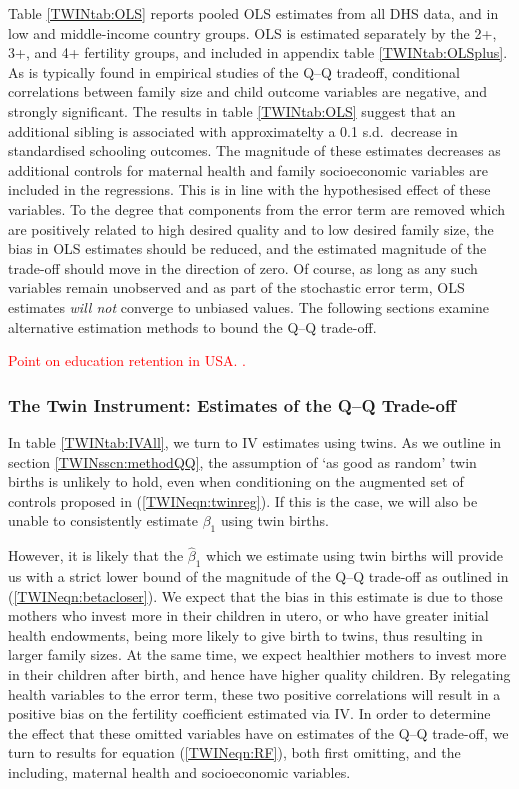 \documentclass[subeqn]{article}
\begin{document}
\begin{spacing}{1.4}
Table \ref{TWINtab:OLS} reports pooled OLS estimates from all DHS data, and in 
low and middle-income country groups. OLS is estimated separately by the 2+, 3+,
and 4+ fertility groups, and included in appendix table \ref{TWINtab:OLSplus}.
As is typically found in empirical studies of the Q--Q tradeoff, conditional 
correlations between family size and child outcome variables are negative, and 
strongly significant.  The results in table \ref{TWINtab:OLS} suggest that an 
additional sibling is associated with approximatelty a 0.1 s.d.\ decrease in 
standardised schooling outcomes.  The magnitude of these estimates decreases
as additional controls for maternal health and family socioeconomic variables
are included in the regressions. This is in line with the hypothesised effect
of these variables.  To the degree that components from the error term are 
removed which are positively related to high desired quality and to low desired 
family size, the bias in OLS estimates should be reduced, and the estimated 
magnitude of the trade-off should move in the direction of zero. Of course, as 
long as any such variables remain unobserved and as part of the stochastic error 
term, OLS estimates \emph{will not} converge to unbiased values.  The following 
sections examine alternative estimation methods to bound the Q--Q trade-off.

\textcolor{red}{Point on education retention in USA. \citet{Warrenetal2014}.}

\subsubsection{The Twin Instrument: Estimates of the Q--Q Trade-off}
In table \ref{TWINtab:IVAll}, we turn to IV estimates using twins.  As we 
outline in section \ref{TWINsscn:methodQQ}, the assumption of `as good as 
random' twin births is unlikely to hold, even when conditioning on the augmented
set of controls proposed in (\ref{TWINeqn:twinreg}). If this is the case, we 
will also be unable to consistently estimate $\beta_1$ using twin births.

However, it is likely that the $\hat\beta_1$ which we estimate using twin births 
will provide us with a strict lower bound of the magnitude of the Q--Q trade-off 
as outlined in (\ref{TWINeqn:betacloser}). We expect that the bias in this 
estimate is due to those mothers who invest more in their children in utero, or 
who have greater initial health endowments, being more likely to give birth to 
twins, thus resulting in larger family sizes. At the same time, we expect 
healthier mothers to invest more in their children after birth, and hence have 
higher quality children. By relegating health variables to the error term, 
these two positive correlations will result in a positive bias on the fertility 
coefficient estimated via IV. In order to determine the effect that these 
omitted variables have on estimates of the Q--Q trade-off, we turn to results 
for equation (\ref{TWINeqn:RF}), both first omitting, and the including, 
maternal health and socioeconomic variables.


\end{spacing}
\end{document}
